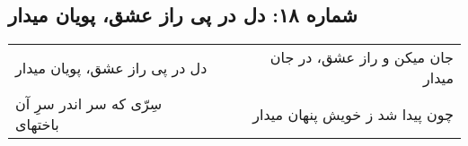 \begin{center}
\section*{شماره ۱۸: دل در پی راز عشق، پویان میدار}
\label{sec:018}
\begin{longtable}{l p{0.5cm} r}
دل در پی راز عشق، پویان میدار
&&
جان میکن و راز عشق، در جان میدار
\\
سِرّی که سر اندر سرِ آن باختهای
&&
چون پیدا شد ز خویش پنهان میدار
\\
\end{longtable}
\end{center}
